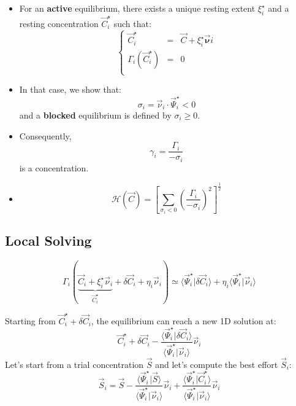 \documentclass[aps,12pt]{revtex4}
\begin{document}
\begin{itemize}
\item For an {\bf active} equilibrium, there exists a unique resting extent $\xi_i^\star$ and a resting concentration $\vec{C}_i^\star$ such that:
\begin{equation}
\left\lbrace
\begin{array}{rcl}
	\vec{C}_i^\star & = & \vec{C} + \xi_i^\star \vec{\bm{\nu}}i\\
	\Gamma_i(\vec{C}_i^\star) & = & 0 \\
\end{array}
\right.
\end{equation}

\item In that case, we show that:
\begin{equation}
	\sigma_i = \vec{\nu}_i \cdot \vec{\Psi}_i^\star < 0
\end{equation}	
and a {\bf blocked} equilibrium is defined by $\sigma_i\geq 0$.

\item Consequently,
\begin{equation}
	\gamma_i = \dfrac{\Gamma_i}{-\sigma_i} 
\end{equation}
is a concentration.

\item \begin{equation}
\mathcal{H}(\vec{C}) = \left\lbrack\sum_{\sigma_i<0} \left(\dfrac{\Gamma_i}{-\sigma_i}\right)^2 \right\rbrack^{\frac{1}{2}}
\end{equation}

 
\end{itemize}
 
\subsection{Local Solving}

	
\begin{equation}
	\Gamma_i ( \underbrace{\vec{C}_i + \xi_i^\star \vec{\nu}_i}_{\vec{C}_i^\star} + \delta\vec{C}_i + \eta_i \vec{\nu}_i  ) \simeq 
	\langle \vec{\Psi}_i^\star \vert \delta\vec{C}_i \rangle + \eta_i \langle \vec{\Psi}_i^\star \vert \vec{\nu}_i \rangle
\end{equation}

Starting from $\vec{C}_i^\star + \delta\vec{C}_i$, the equilibrium can reach a new 1D solution at:
\begin{equation}
	\vec{C}_i^\star + \delta\vec{C}_i - \dfrac{\langle \vec{\Psi}_i^\star \vert \delta\vec{C}_i \rangle}{\langle \vec{\Psi}_i^\star \vert \vec{\nu}_i \rangle
} \vec{\nu}_i
\end{equation}
Let's start from a trial concentration $\vec{S}$ and let's compute the best effort $\vec{S}_i$:
\begin{equation}
	\vec{S}_i = \vec{S} - \dfrac{\langle \vec{\Psi}_i^\star \vert \vec{S} \rangle}{\langle \vec{\Psi}_i^\star \vert \vec{\nu}_i \rangle
} \vec{\nu}_i + \dfrac{\langle \vec{\Psi}_i^\star \vert  \vec{C}_i^\star \rangle}{\langle \vec{\Psi}_i^\star \vert \vec{\nu}_i \rangle
} \vec{\nu}_i
\end{equation}
 
\end{document}
